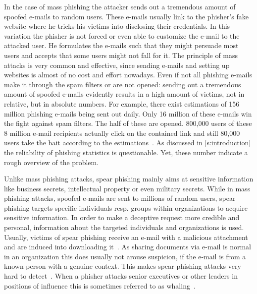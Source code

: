 \begin{description}[leftmargin=0cm]
	\item[Mass Phishing:] In the case of mass phishing the attacker sends out a tremendous amount of spoofed e-mails to random users.
 These e-mails usually link to the phisher's fake website where he tricks his victims into disclosing their credentials.
 In this variation the phisher is not forced or even able to customize the e-mail to the attacked user.
 He formulates the e-mails such that they might persuade most users and accepts that some users might not fall for it.
 The principle of mass attacks is very common and effective, since sending e-mails and setting up websites is almost of no cost and effort nowadays.
 Even if not all phishing e-mails make it through the spam filters or are not opened: sending out a tremendous amount of spoofed e-mails evidently results in a high amount of victims, not in relative, but in absolute numbers.
 For example, there exist estimations of 156 million phishing e-mails being sent out daily.
 Only 16 million of these e-mails win the fight against spam filters.
 The half of these are opened.
 800,000 users of these 8 million e-mail recipients actually click on the contained link and still 80,000 users take the bait according to the estimations~\cite{takethebait}. As discussed in \autoref{s:introduction} the reliability of phishing statistics is questionable. Yet, these number indicate a rough overview of the problem.
	\item[Spear Phishing:] Unlike mass phishing attacks, spear phishing mainly aims at sensitive information like business secrets, intellectual property or even military secrets.
 While in mass phishing attacks, spoofed e-mails are sent to millions of random users, spear phishing targets specific individuals resp.
 groups within organizations to acquire sensitive information.
 In order to make a deceptive request more credible and personal, information about the targeted individuals and organizations is used.
 Usually, victims of spear phishing receive an e-mail with a malicious attachment and are induced into downloading it~\cite{trendlabs2012spear}.
 As sharing documents via e-mail is normal in an organization this does usually not arouse suspicion, if the e-mail is from a known person with a genuine context.
 This makes spear phishing attacks very hard to detect~\cite{trendlabs2012spear,statephishinghong}.
When a phisher attacks senior executives or other leaders in positions of influence this is sometimes referred to as whaling~\cite{whaling}.
\end{description}

